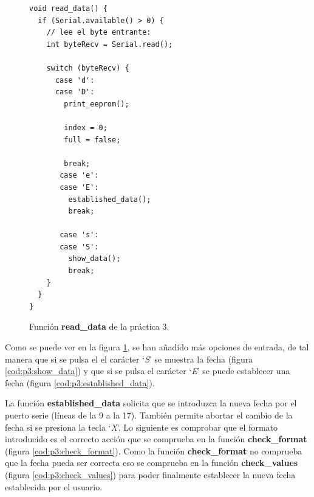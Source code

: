 \documentclass{article}
\begin{document}
\begin{figure}[h]
	\begin{lstlisting}[style=c]
void read_data() {
  if (Serial.available() > 0) {
    // lee el byte entrante:
    int byteRecv = Serial.read();
    
    switch (byteRecv) {
      case 'd':
      case 'D':
        print_eeprom();
        
        index = 0;
        full = false;
        
        break;
       case 'e':
       case 'E':
         established_data();
         break;
       
       case 's':
       case 'S':
         show_data();
         break;
    }
  }
}
	\end{lstlisting}
	\caption{Función \textbf{read\_data} de la práctica 3.}
	\label{cod:p3:read_data}
\end{figure}


	Como se puede ver en la figura \ref{cod:p3:read_data}, se han añadido más opciones de entrada, de tal manera que si se pulsa el el carácter `\textit{S}' se muestra la fecha (figura \ref{cod:p3:show_data}) y que si se pulsa el carácter `\textit{E}' se puede establecer una fecha (figura \ref{cod:p3:established_data}).
	
	La función \textbf{established\_data} solicita que se introduzca la nueva fecha por el puerto serie (líneas de la 9 a la 17). También permite abortar el cambio de la fecha si se presiona la tecla `\textit{X}'. Lo siguiente es comprobar que el formato introducido es el correcto acción que se comprueba en la función \textbf{check\_format} (figura \ref{cod:p3:check_format}). Como la función \textbf{check\_format} no comprueba que la fecha pueda ser correcta eso se comprueba en la función \textbf{check\_values} (figura \ref{cod:p3:check_values}) para poder finalmente establecer la nueva fecha establecida por el usuario.
\end{document}
